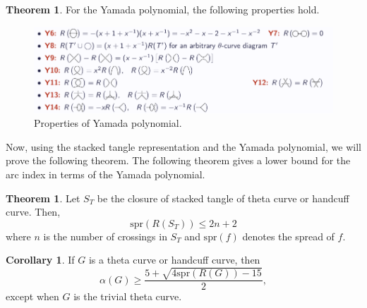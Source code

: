 \documentclass{article}
\theoremstyle{definition}
\theoremstyle{theorem}
\newtheorem{theorem}[thm]{Theorem}
\theoremstyle{proposition}
\theoremstyle{corollary}
\newtheorem{corol}[thm]{Corollary}
\begin{document}
\begin{theorem}
    For the Yamada polynomial, the following properties hold.
    \begin{figure}[h]
        \centerline{\includegraphics[width=0.75\linewidth]{yamada_property.png}}
        \caption{Properties of Yamada polynomial.}
        \label{figure_3}
    \end{figure}
\end{theorem}

Now, using the stacked tangle representation and the Yamada polynomial, we will prove the following theorem. The following theorem gives a lower bound for the arc index in terms of the Yamada polynomial.

\begin{theorem}
    Let $S_T$ be the closure of stacked tangle of theta curve or handcuff curve. Then,
    \[ \text{spr}(R(S_T)) \leq 2n+2 \]
    where $n$ is the number of crossings in $S_T$ and $\mathrm{spr}(f)$ denotes the spread of $f$.
\end{theorem}

\begin{corol}
    If $G$ is a theta curve or handcuff curve, then
    \[ \alpha(G) \geq \frac{5 + \sqrt{4 \mathrm{spr}(R(G)) - 15}}{2}, \]
    except when $G$ is the trivial theta curve.
\end{corol}
\end{document}
